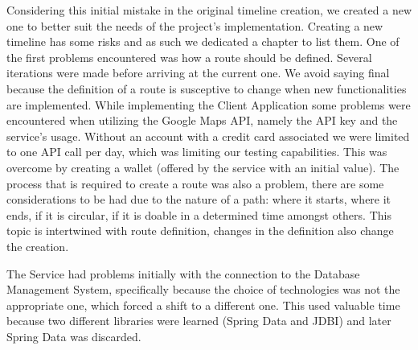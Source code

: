 \documentclass{article}
\begin{document}
        Considering this initial mistake in the original timeline creation, we created a new one to better suit the needs of the project's implementation.
        Creating a new timeline has some risks and as such we dedicated a chapter to list them.
        One of the first problems encountered was how a route should be defined. Several iterations were made before arriving at the current one. We avoid saying final
        because the definition of a route is susceptive to change when new functionalities are implemented.
        While implementing the Client Application some problems were encountered when utilizing the Google Maps API, namely the API key and the service's usage. 
        Without an account with a credit card associated we were limited to one API call per day, which was limiting our testing capabilities. This was overcome by creating a wallet (offered by the service with an initial value).
        The process that is required to create a route was also a problem, there are some considerations to be had due to the nature of a path: where it starts, where it ends, if it is circular, if it is doable in a determined time amongst others.
        This topic is intertwined with route definition, changes in the definition also change the creation.\par

        The Service had problems initially with the connection to the Database Management System, specifically because the choice of technologies was not the appropriate one, which
        forced a shift to a different one. This used valuable time because two different libraries were learned (Spring Data and JDBI) and later Spring Data was discarded.


        \newpage    
    
    \printbibliography
\end{document}
